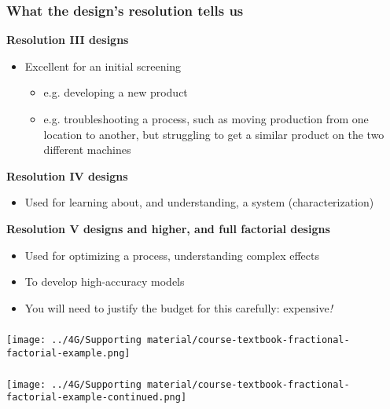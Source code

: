 \begin{frame}\frametitle{What the design's resolution tells us}

	\textbf{Resolution \textrm{III} designs}
	\begin{itemize}
		\item	Excellent for an initial screening
			\begin{itemize}
				\item	e.g. developing a new product 
				\item	e.g. troubleshooting a process, such as moving production from one location to another, but struggling to get a similar product on the two different machines
			\end{itemize}
	\end{itemize}

	\pause
	\vspace{0.5cm}
	\textbf{Resolution \textrm{IV} designs}
	\begin{itemize}
		\item	Used for learning about, and understanding, a system (characterization)
	\end{itemize}
	
	\pause
	\vspace{0.5cm}
	\textbf{Resolution \textrm{V} designs and higher, and full factorial designs}
	\begin{itemize}
		\item	Used for optimizing a process, understanding complex effects
		\item	To develop high-accuracy models
		\item	You will need to justify the budget for this carefully: expensive\emph{!}
	\end{itemize}
\end{frame}

\begin{frame}\frametitle{}
	\vspace{0.5cm}
	\centerline{\texttt{[image: ../4G/Supporting material/course-textbook-fractional-factorial-example.png]}}
		
\end{frame}

\begin{frame}\frametitle{}
	\vspace{0.5cm}
	\centerline{\texttt{[image: ../4G/Supporting material/course-textbook-fractional-factorial-example-continued.png]}}
		
\end{frame}

